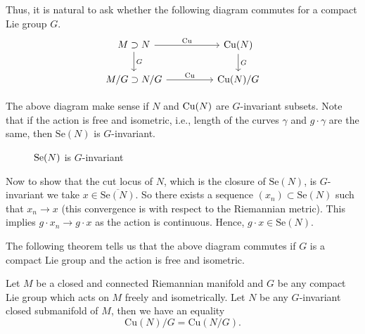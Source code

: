 \noindent Thus, it is natural to ask whether the following diagram commutes for a compact Lie group $G$. 
\begin{displaymath}
	\begin{tikzcd}
		M \supset N \arrow[d,  "G"] \arrow[rr, "\mathrm{Cu}"] &  &  \mathrm{Cu}(N) \arrow[d, "G"]\\
		M/G \supset N/G \arrow[rr, "\mathrm{Cu}"]& & \mathrm{Cu}(N)/G
	\end{tikzcd}
\end{displaymath}

\noindent The above diagram make sense if $N$ and $\mathrm{Cu}(N)$ are $G$-invariant subsets. Note that if the action is free and isometric, i.e., length of the curves $\gamma$ and $g\cdot \gamma$ are the same,  then $\mathrm{Se}(N)$ is $G$-invariant. 
\begin{figure}[!htbp]
	\centering
	\begin{subfigure}{.45\textwidth}
	\end{subfigure}
	\begin{subfigure}{.45\textwidth}
	\end{subfigure}
	\caption{$\mathrm{Se}(N)$ is $G$-invariant}
\end{figure}
\noindent Now to show that the cut locus of $N$, which is the closure of $\mathrm{Se}(N)$,  is $G$-invariant we take $x\in \overline{\mathrm{Se}(N)}$. So there exists a sequence $\left(x_n\right) \subset \mathrm{Se}(N)$ such that $x_n\to x$ (this convergence is with respect to the Riemannian metric). This implies $g\cdot x_n \to g\cdot x$ as the action is continuous. Hence, $g\cdot x\in \mathrm{Se}(N).$  

\hf The following theorem tells us that the above diagram commutes if $G$ is a compact Lie group and the action is free and isometric.

\begin{thm}\label{thm:equivariant-cut-locus}
    Let $M$ be a closed and connected Riemannian manifold  and $G$ be any compact Lie group which acts on $M$ freely and isometrically. Let $N$ be any $G$-invariant closed submanifold of $M$, then we have an equality
    \begin{displaymath}
        \mathrm{Cu}(N)/G = \mathrm{Cu}(N/G).
    \end{displaymath}
\end{thm}

